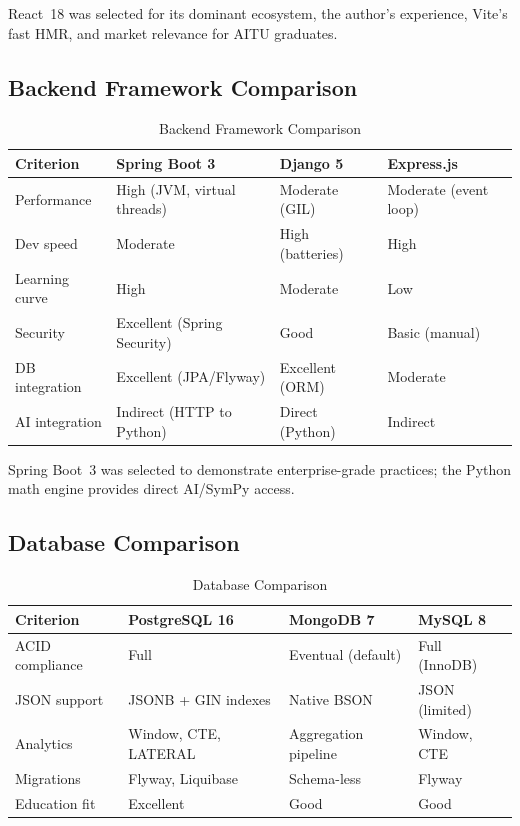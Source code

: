 React~18 was selected for its dominant ecosystem, the author's experience, Vite's fast HMR, and market relevance for AITU graduates.

\subsection{Backend Framework Comparison}
\label{subsec:backend-comparison}

\begin{table}[htbp]
\centering
\caption{Backend Framework Comparison}
\label{tab:backend-comparison}
\begin{tabular}{p{2.5cm}p{3.5cm}p{3.5cm}p{3.5cm}}
\toprule
\textbf{Criterion} & \textbf{Spring Boot 3} & \textbf{Django 5} & \textbf{Express.js} \\
\midrule
Performance & High (JVM, virtual threads) & Moderate (GIL) & Moderate (event loop) \\
Dev speed & Moderate & High (batteries) & High \\
Learning curve & High & Moderate & Low \\
Security & Excellent (Spring Security) & Good & Basic (manual) \\
DB integration & Excellent (JPA/Flyway) & Excellent (ORM) & Moderate \\
AI integration & Indirect (HTTP to Python) & Direct (Python) & Indirect \\
\bottomrule
\end{tabular}
\end{table}

Spring Boot~3 was selected to demonstrate enterprise-grade practices; the Python math engine provides direct AI/SymPy access.

\subsection{Database Comparison}
\label{subsec:db-comparison}

\begin{table}[htbp]
\centering
\caption{Database Comparison}
\label{tab:db-comparison}
\begin{tabular}{p{2.8cm}p{3.5cm}p{3.5cm}p{3cm}}
\toprule
\textbf{Criterion} & \textbf{PostgreSQL 16} & \textbf{MongoDB 7} & \textbf{MySQL 8} \\
\midrule
ACID compliance & Full & Eventual (default) & Full (InnoDB) \\
JSON support & JSONB + GIN indexes & Native BSON & JSON (limited) \\
Analytics & Window, CTE, LATERAL & Aggregation pipeline & Window, CTE \\
Migrations & Flyway, Liquibase & Schema-less & Flyway \\
Education fit & Excellent & Good & Good \\
\bottomrule
\end{tabular}
\end{table}

